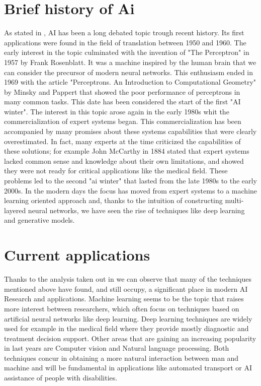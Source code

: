 \documentclass{article}
\begin{document}
\newpage

\section{Brief history of Ai}

As stated in \cite{AIhistory}, AI has been a long debated topic trough recent history.
Its first applications were found in the field of translation
between 1950 and 1960.
The early interest in the topic culminated with the invention
of "The Perceptron" in 1957 by Frank Rosenblatt.
It was a machine
inspired by the human brain that we can consider the precursor of
modern neural networks.
This enthusiasm ended in 1969 with the article "Perceptrons. An
Introduction to Computational Geometry" by Minsky and Pappert that showed
the poor performance of perceptrons in many common tasks.
This date has been considered the start of the first "AI winter".
The interest in this topic arose again in the early 1980s
whit the commercialization of expert systems began.
This commercialization has been accompanied by many promises about
these systems capabilities that were clearly overestimated.
In fact, many experts at the time criticized the capabilities of
these solutions; for example John McCarthy in 1884
stated that expert systems lacked common sense
and knowledge about their own limitations, and showed they were
not ready for critical applications like the medical field.
These problems led to the second "ai winter" that lasted
from the late 1980s to the early 2000s.
In the modern days the focus has moved from expert systems
to a machine learning oriented approach and, thanks to the
intuition of constructing multi-layered neural networks, we have
seen the rise of techniques like deep learning and generative models.


\section{Current applications}

Thanks to the analysis taken out in \cite{AIsubfields} we can observe
that  many of the techniques mentioned above have found,
and still occupy, a significant place in modern AI Research and
applications.
Machine learning seems to be the topic that raises more interest between
researchers, which often focus on techniques based on artificial
neural networks like deep learning.
Deep learning techniques are widely used for example in the medical field
where they provide mostly diagnostic and treatment decision support.
Other areas that are gaining an increasing popularity in last years are
Computer vision and Natural language processing.
Both techniques concur in obtaining a more natural interaction
between man and machine and will be fundamental in applications like
automated transport or AI assistance of people with disabilities.
\end{document}
